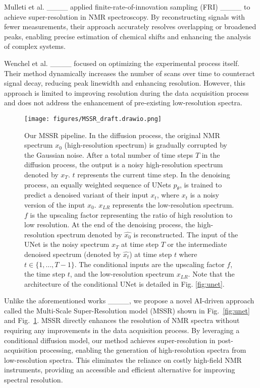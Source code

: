 Mulleti et al. ____ applied finite-rate-of-innovation sampling (FRI) ____ to achieve super-resolution in NMR spectroscopy. By reconstructing signals with fewer measurements, their approach accurately resolves overlapping or broadened peaks, enabling precise estimation of chemical shifts and enhancing the analysis of complex systems.

Wenchel et al. ____ focused on optimizing the experimental process itself. Their method dynamically increases the number of scans over time to counteract signal decay, reducing peak linewidth and enhancing resolution. However, this approach is limited to improving resolution during the data acquisition process and does not address the enhancement of pre-existing low-resolution spectra.

\begin{figure*}[btp]
    \centering
    \texttt{[image: figures/MSSR\_draft.drawio.png]}
    \caption{Our MSSR pipeline. In the diffusion process, the original NMR spectrum $x_0$ (high-resolution spectrum) is gradually corrupted by the Gaussian noise. After a total number of time steps $T$ in the diffusion process, the output is a noisy high-resolution spectrum denoted by $x_T$. $t$ represents the current time step.
    In the denoising process, an equally weighted sequence of UNets $p_{\theta}$, is trained to predict a denoised variant of their input $x_t$, where $x_t$ is a noisy version of the input $x_0$. $x_{LR}$ represents the low-resolution spectrum. $f$ is the upscaling factor representing the ratio of high resolution to low resolution.  At the end of the denoising process, the high-resolution spectrum denoted by $\widehat{x_0}$ is reconstructed. 
    The input of the UNet is the noisy spectrum $x_T$ at time step $T$ or the intermediate denoised spectrum (denoted by $\widehat{x_t}$) at time step $t$ where $t \in \{1,\dots,T-1\}$. The conditional inputs are the upscaling factor $f$, the time step $t$, and the low-resolution spectrum $x_{LR}$.
    Note that the architecture of the conditional UNet is detailed in Fig. \ref{fig:unet}.
    }
    \label{mssr}
\end{figure*}

Unlike the aforementioned works ____, we propose a novel AI-driven approach called the Multi-Scale Super-Resolution model (MSSR) shown in Fig.~\ref{fig:unet} and Fig.~\ref{mssr}. MSSR directly enhances the resolution of NMR spectra without requiring any improvements in the data acquisition process. By leveraging a conditional diffusion model, our method achieves super-resolution in post-acquisition processing, enabling the generation of high-resolution spectra from low-resolution spectra. This eliminates the reliance on costly high-field NMR instruments, providing an accessible and efficient alternative for improving spectral resolution.